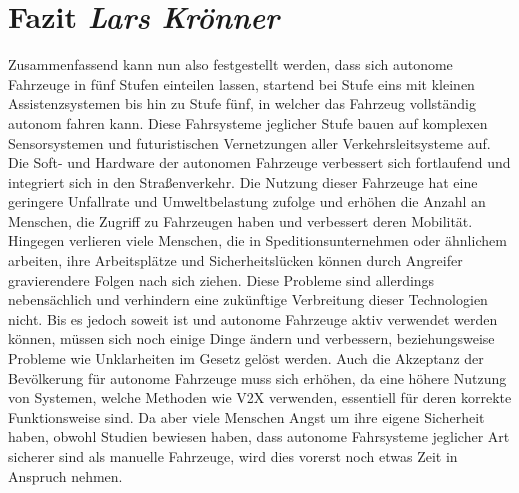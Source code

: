 \documentclass[a4paper, 12pt, openany]{book}
\newcommand\Chapter[2]{\chapter[#1 {\scriptsize\itshape#2}]{#1 \footnotesize\itshape#2}}
\begin{document}

        
    
    
    \Chapter{Fazit}{Lars Krönner}
        Zusammenfassend kann nun also festgestellt werden, dass sich autonome Fahrzeuge in fünf Stufen einteilen lassen, startend bei Stufe eins mit kleinen Assistenzsystemen bis hin zu Stufe fünf, in welcher das Fahrzeug vollständig autonom fahren kann. Diese Fahrsysteme jeglicher Stufe bauen auf komplexen Sensorsystemen und futuristischen Vernetzungen aller Verkehrsleitsysteme auf. Die Soft- und Hardware der autonomen Fahrzeuge verbessert sich fortlaufend und integriert sich in den Straßenverkehr. Die Nutzung dieser Fahrzeuge hat eine geringere Unfallrate und Umweltbelastung zufolge und erhöhen die Anzahl an Menschen, die Zugriff zu Fahrzeugen haben und verbessert deren Mobilität. Hingegen verlieren viele Menschen, die in Speditionsunternehmen oder ähnlichem arbeiten, ihre Arbeitsplätze und Sicherheitslücken können durch Angreifer gravierendere Folgen nach sich ziehen. Diese Probleme sind allerdings nebensächlich und verhindern eine zukünftige Verbreitung dieser Technologien nicht. Bis es jedoch soweit ist und autonome Fahrzeuge aktiv verwendet werden können, müssen sich noch einige Dinge ändern und verbessern, beziehungsweise Probleme wie Unklarheiten im Gesetz gelöst werden. Auch die Akzeptanz der Bevölkerung für autonome Fahrzeuge muss sich erhöhen, da eine höhere Nutzung von Systemen, welche Methoden wie V2X verwenden, essentiell für deren korrekte Funktionsweise sind. Da aber viele Menschen Angst um ihre eigene Sicherheit haben, obwohl Studien bewiesen haben, dass autonome Fahrsysteme jeglicher Art sicherer sind als manuelle Fahrzeuge, wird dies vorerst noch etwas Zeit in Anspruch nehmen.
        
\end{document}
